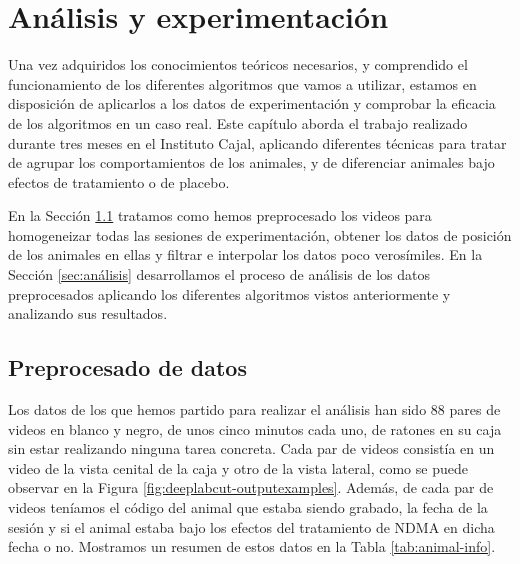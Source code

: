 \chapter{Análisis y experimentación}
\label{chap:analisis-y-experimentacion}

Una vez adquiridos los conocimientos teóricos necesarios, y comprendido el funcionamiento de los diferentes algoritmos que vamos a utilizar, estamos en disposición de aplicarlos a los datos de experimentación y comprobar la eficacia de los algoritmos en un caso real. Este capítulo aborda el trabajo realizado durante tres meses en el Instituto Cajal, aplicando diferentes técnicas para tratar de agrupar los comportamientos de los animales, y de diferenciar animales bajo efectos de tratamiento o de placebo.

En la Sección \ref{sec:preprocesado} tratamos como hemos preprocesado los videos para homogeneizar todas las sesiones de experimentación, obtener los datos de posición de los animales en ellas y filtrar e interpolar los datos poco verosímiles. En la Sección \ref{sec:análisis} desarrollamos el proceso de análisis de los datos preprocesados aplicando los diferentes algoritmos vistos anteriormente y analizando sus resultados.

\section{Preprocesado de datos} \label{sec:preprocesado}

Los datos de los que hemos partido para realizar el análisis han sido 88 pares de videos en blanco y negro, de unos cinco minutos cada uno, de ratones en su caja sin estar realizando ninguna tarea concreta. Cada par de videos consistía en un video de la vista cenital de la caja y otro de la vista lateral, como se puede observar en la Figura \ref{fig:deeplabcut-outputexamples}. Además, de cada par de videos teníamos el código del animal que estaba siendo grabado, la fecha de la sesión y si el animal estaba bajo los efectos del tratamiento de NDMA en dicha fecha o no. Mostramos un resumen de estos datos en la Tabla \ref{tab:animal-info}.

